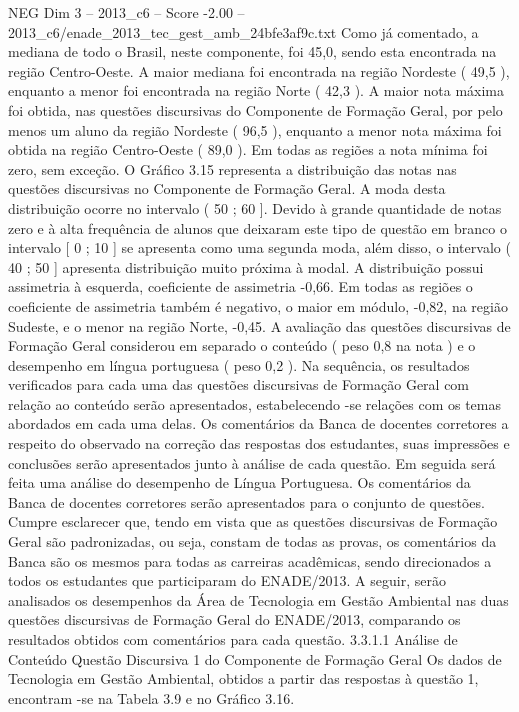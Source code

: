 \begin{textsample}{NEG Dim 3 – 2013\_c6 – Score -2.00 – 2013\_c6/enade\_2013\_tec\_gest\_amb\_24bfe3af9c.txt}
Como já comentado, a mediana de todo o Brasil, neste componente, foi 45,0, sendo esta encontrada na região Centro-Oeste.
A maior mediana foi encontrada na região Nordeste ( 49,5 ), enquanto a menor foi encontrada na região Norte ( 42,3 ).
A maior nota máxima foi obtida, nas questões discursivas do Componente de Formação Geral, por pelo menos um aluno da região Nordeste ( 96,5 ), enquanto a menor nota máxima foi obtida na região Centro-Oeste ( 89,0 ).
Em todas as regiões a nota mínima foi zero, sem exceção.
O Gráfico 3.15 representa a distribuição das notas nas questões discursivas no Componente de Formação Geral.
A moda desta distribuição ocorre no intervalo ( 50 ; 60 ].
Devido à grande quantidade de notas zero e à alta frequência de alunos que deixaram este tipo de questão em branco o intervalo [ 0 ; 10 ] se apresenta como uma segunda moda, além disso, o intervalo ( 40 ; 50 ] apresenta distribuição muito próxima à modal.
A distribuição possui assimetria à esquerda, coeficiente de assimetria -0,66.
Em todas as regiões o coeficiente de assimetria também é negativo, o maior em módulo, -0,82, na região Sudeste, e o menor na região Norte, -0,45.
A avaliação das questões discursivas de Formação Geral considerou em separado o conteúdo ( peso 0,8 na nota ) e o desempenho em língua portuguesa ( peso 0,2 ).
Na sequência, os resultados verificados para cada uma das questões discursivas de Formação Geral com relação ao conteúdo serão apresentados, estabelecendo -se relações com os temas abordados em cada uma delas.
Os comentários da Banca de docentes corretores a respeito do observado na correção das respostas dos estudantes, suas impressões e conclusões serão apresentados junto à análise de cada questão.
Em seguida será feita uma análise do desempenho de Língua Portuguesa.
Os comentários da Banca de docentes corretores serão apresentados para o conjunto de questões.
Cumpre esclarecer que, tendo em vista que as questões discursivas de Formação Geral são padronizadas, ou seja, constam de todas as provas, os comentários da Banca são os mesmos para todas as carreiras acadêmicas, sendo direcionados a todos os estudantes que participaram do ENADE/2013.
A seguir, serão analisados os desempenhos da Área de Tecnologia em Gestão Ambiental nas duas questões discursivas de Formação Geral do ENADE/2013, comparando os resultados obtidos com comentários para cada questão. 3.3.1.1 Análise de Conteúdo Questão Discursiva 1 do Componente de Formação Geral Os dados de Tecnologia em Gestão Ambiental, obtidos a partir das respostas à questão 1, encontram -se na Tabela 3.9 e no Gráfico 3.16.

\end{textsample}
